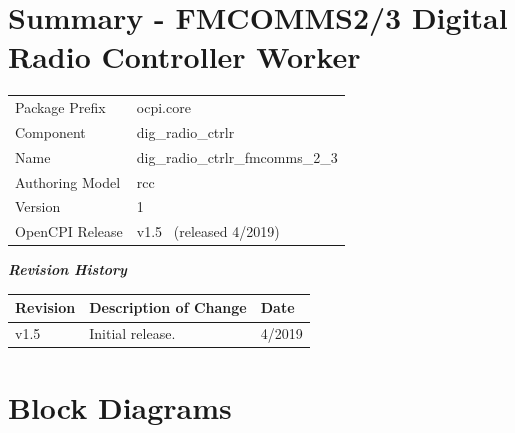 \documentclass{article}
\author{} %
\date{Version \docVersion} %
\title{\docTitle}
\def\docVersion{1.5}
\def\comp{dig\_radio\_ctrlr\_fmcomms\_2\_3}
\begin{document}
\section*{Summary - FMCOMMS2/3 Digital Radio Controller Worker}
\begin{longtable}{|p{}
                  |p{}|}
	\hline
	\rowcolor{blue}
	                  &                                        \\
	\hline
	Package Prefix    & ocpi.core \\
	\hline
	Component         & dig\_radio\_ctrlr \\
	\hline
	Name              & \comp                                  \\
	\hline
	Authoring Model   & rcc                                    \\
	\hline
	Version          & 1 \\
	\hline
	OpenCPI Release & v\docVersion ~ (released 4/2019) \\
	\hline
\end{longtable}

\begin{center}
  \textit{\textbf{Revision History}}
  \begin{longtable}{|p{}
                    |p{}
                    |p{}|}
    \hline
    \rowcolor{blue}
    \textbf{Revision} & \textbf{Description of Change} & \textbf{Date} \\
    \hline
    v1.5 & Initial release. & 4/2019 \\
    \hline
  \end{longtable}
\end{center}

\section{Block Diagrams}
\end{document}
